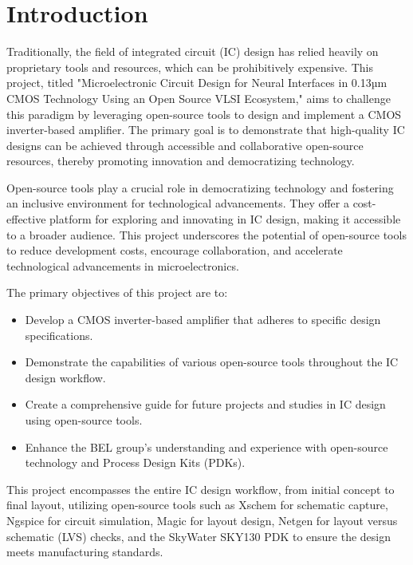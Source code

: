 \chapter{Introduction}
\label{chap:introduction}

Traditionally, the field of integrated circuit (IC) design has relied heavily on proprietary tools and resources, which can be prohibitively expensive. This project, titled "Microelectronic Circuit Design for Neural Interfaces in 0.13µm CMOS Technology Using an Open Source VLSI Ecosystem," aims to challenge this paradigm by leveraging open-source tools to design and implement a CMOS inverter-based amplifier. The primary goal is to demonstrate that high-quality IC designs can be achieved through accessible and collaborative open-source resources, thereby promoting innovation and democratizing technology.

Open-source tools play a crucial role in democratizing technology and fostering an inclusive environment for technological advancements. They offer a cost-effective platform for exploring and innovating in IC design, making it accessible to a broader audience. This project underscores the potential of open-source tools to reduce development costs, encourage collaboration, and accelerate technological advancements in microelectronics.

The primary objectives of this project are to:
\begin{itemize}
\item Develop a CMOS inverter-based amplifier that adheres to specific design specifications.
\item Demonstrate the capabilities of various open-source tools throughout the IC design workflow.
\item Create a comprehensive guide for future projects and studies in IC design using open-source tools.
\item Enhance the BEL \parencite{Department_of_Biosystems_Science_and_Engineering_2024} group's understanding and experience with open-source technology and Process Design Kits (PDKs).
\end{itemize}

This project encompasses the entire IC design workflow, from initial concept to final layout, utilizing open-source tools such as Xschem for schematic capture, Ngspice for circuit simulation, Magic for layout design, Netgen for layout versus schematic (LVS) checks, and the SkyWater SKY130 PDK to ensure the design meets manufacturing standards.

